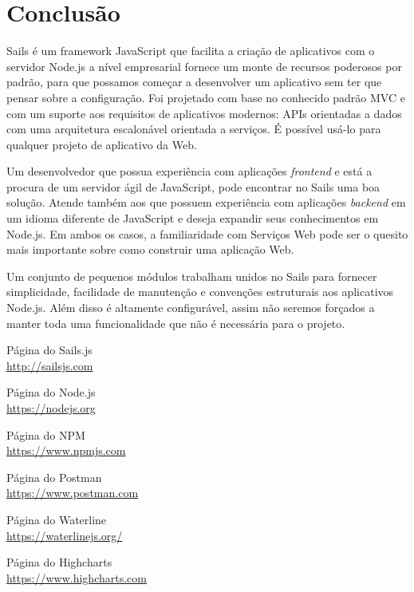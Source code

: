\documentclass[a4paper,11pt]{article}
\begin{document}
\section{Conclusão}
Sails é um framework JavaScript que facilita a criação de aplicativos com o servidor Node.js a nível empresarial fornece um monte de recursos poderosos por padrão, para que possamos começar a desenvolver um aplicativo sem ter que pensar sobre a configuração. Foi projetado com base no conhecido padrão MVC e com um suporte aos requisitos de aplicativos modernos: APIs orientadas a dados com uma arquitetura escalonável orientada a serviços. É possível usá-lo para qualquer projeto de aplicativo da Web.

Um desenvolvedor que possua experiência com aplicações \textit{frontend} e está a procura de um servidor ágil de JavaScript, pode encontrar no Sails uma boa solução. Atende também aos que possuem experiência com aplicações \textit{backend} em um idioma diferente de JavaScript e deseja expandir seus conhecimentos em Node.js. Em ambos os casos, a familiaridade com Serviços Web pode ser o quesito mais importante sobre como construir uma aplicação Web.

Um conjunto de pequenos módulos trabalham unidos no Sails para fornecer simplicidade, facilidade de manutenção e convenções estruturais aos aplicativos Node.js. Além disso é altamente configurável, assim não seremos forçados a manter toda uma funcionalidade que não é necessária para o projeto. 



\begin{thebibliography}{9}
  Página do Sails.js \\
  \url{http://sailsjs.com}
  
  Página do Node.js \\
  \url{https://nodejs.org}
  
  Página do NPM \\
  \url{https://www.npmjs.com} 
  
  Página do Postman \\
  \url{https://www.postman.com}

  Página do Waterline \\
  \url{https://waterlinejs.org/}

  Página do Highcharts \\
  \url{https://www.highcharts.com}

  
\end{thebibliography}
  
\end{document}
